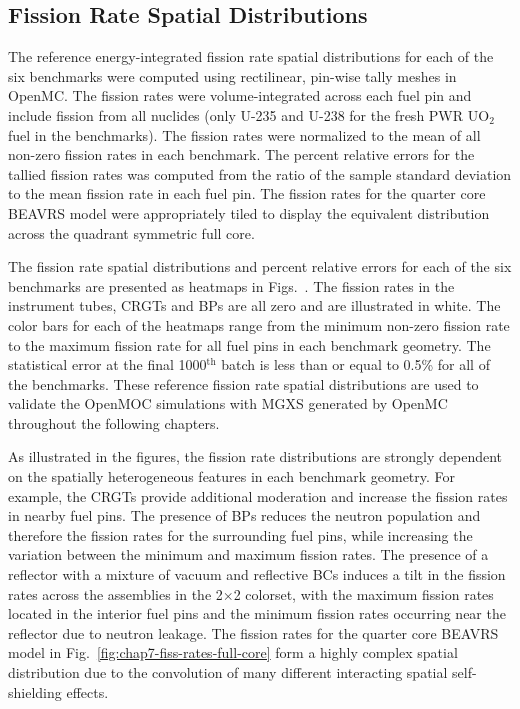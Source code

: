 \subsection{Fission Rate Spatial Distributions}
\label{subsec:chap7-pin-powers}

The reference energy-integrated fission rate spatial distributions for each of the six benchmarks were computed using rectilinear, pin-wise tally meshes in OpenMC. The fission rates were volume-integrated across each fuel pin and include fission from all nuclides (only U-235 and U-238 for the fresh \ac{PWR} UO$_2$ fuel in the benchmarks). The fission rates were normalized to the mean of all non-zero fission rates in each benchmark. The percent relative errors for the tallied fission rates was computed from the ratio of the sample standard deviation to the mean fission rate in each fuel pin. The fission rates for the quarter core \ac{BEAVRS} model were appropriately tiled to display the equivalent distribution across the quadrant symmetric full core.

The fission rate spatial distributions and percent relative errors for each of the six benchmarks are presented as heatmaps in Figs.~. The fission rates in the instrument tubes, \acp{CRGT} and \acp{BP} are all zero and are illustrated in white. The color bars for each of the heatmaps range from the minimum non-zero fission rate to the maximum fission rate for all fuel pins in each benchmark geometry. The statistical error at the final 1000$^{\text{th}}$ batch is less than or equal to 0.5\% for all of the benchmarks. These reference fission rate spatial distributions are used to validate the OpenMOC simulations with \ac{MGXS} generated by OpenMC throughout the following chapters.


As illustrated in the figures, the fission rate distributions are strongly dependent on the spatially heterogeneous features in each benchmark geometry. For example, the \acp{CRGT} provide additional moderation and increase the fission rates in nearby fuel pins. The presence of \acp{BP} reduces the neutron population and therefore the fission rates for the surrounding fuel pins, while increasing the variation between the minimum and maximum fission rates. The presence of a reflector with a mixture of vacuum and reflective \acp{BC} induces a tilt in the fission rates across the assemblies in the 2$\times$2 colorset, with the maximum fission rates located in the interior fuel pins and the minimum fission rates occurring near the reflector due to neutron leakage. The fission rates for the quarter core \ac{BEAVRS} model in Fig.~\ref{fig:chap7-fiss-rates-full-core} form a highly complex spatial distribution due to the convolution of many different interacting spatial self-shielding effects.

